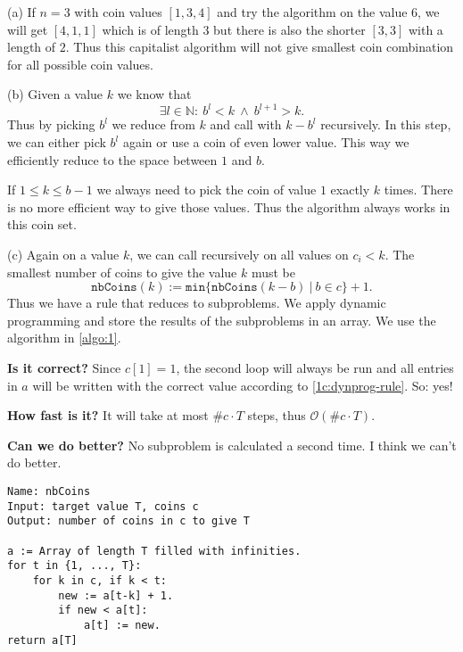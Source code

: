 \documentclass[12pt]{article}
\begin{document}
 

 

  (a) If $n=3$ with coin values $[1,3,4]$ and try the algorithm on the value $6$, we will get $[4,1,1]$ which is of length $3$ but there is also the shorter $[3,3]$ with a length of $2$. Thus this capitalist algorithm will not give smallest coin combination for all possible coin values.
 
 (b) Given a value $k$ we know that \begin{equation}
 	\exists l\in\mathbb{N}:\ b^l<k\ \land\ b^{l+1}>k.
 \end{equation} Thus by picking $b^l$ we reduce from $k$ and call with $k-b^l$ recursively. In this step, we can either pick $b^l$ again or use a coin of even lower value. This way we efficiently reduce to the space between $1$ and $b$.
 
 If $1\leq k\leq b-1$ we always need to pick the coin of value $1$ exactly $k$ times. There is no more efficient way to give those values. Thus the algorithm always works in this coin set.
 
 (c) Again on a value $k$, we can call recursively on all values on $c_i<k$. The smallest number of coins to give the value $k$ must be \begin{equation}\label{1c:dynprog-rule}
  	\texttt{nbCoins}(k):=\texttt{min}\big\{\texttt{nbCoins}(k-b)\ |\ b\in c\big\} + 1.
 \end{equation} Thus we have a rule that reduces to subproblems. We apply dynamic programming and store the results of the subproblems in an array. We use the algorithm in \autoref{algo:1}.
 
 \textbf{Is it correct?} Since $c[1]=1$, the second loop will always be run and all entries in $a$ will be written with the correct value according to \autoref{1c:dynprog-rule}. So: yes!
 
 \textbf{How fast is it?} It will take at most $\#c\cdot T$ steps, thus $\mathcal{O}(\#c\cdot T)$.
 
 \textbf{Can we do better?} No subproblem is calculated a second time. I think we can't do better.

\begin{lstlisting}[caption={Minimum number of coins},label={algo:1}]
Name: nbCoins
Input: target value T, coins c
Output: number of coins in c to give T

a := Array of length T filled with infinities.
for t in {1, ..., T}:
	for k in c, if k < t:
		new := a[t-k] + 1.
		if new < a[t]:
			a[t] := new.
return a[T]
\end{lstlisting}
 
\end{document}
